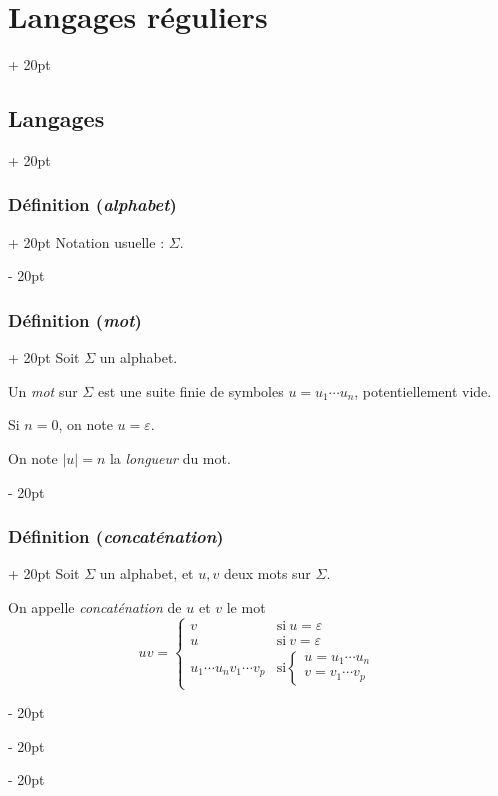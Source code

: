 \documentclass[a4paper, 12pt, twoside]{article}
\newcommand{\abs}[1]{\left\lvert #1 \right\rvert}
\newcommand{\ind}[1][20pt]{\advance\leftskip + #1}
\newcommand{\deind}[1][20pt]{\advance\leftskip - #1}
\newenvironment{indt}[2][20pt]{#2 \par \ind[#1]}{\par \deind} %
\begin{document}
\begin{indt}{\section{Langages réguliers}}
\begin{indt}{\subsection{Langages}}
\begin{indt}{\subsubsection{Définition (\textit{alphabet})}}
                Notation usuelle : $\Sigma$.
            \end{indt}

            \vspace{12pt}
            
            \begin{indt}{\subsubsection{Définition (\textit{mot})}}
                Soit $\Sigma$ un alphabet.

                Un \emph{mot} sur $\Sigma$ est une suite finie de symboles $u = u_1 \cdots u_n$, potentiellement vide.

                Si $n = 0$, on note $u = \varepsilon$.

                On note $\abs u = n$ la \emph{longueur} du mot.
            \end{indt}

            \vspace{12pt}
            
            \begin{indt}{\subsubsection{Définition (\textit{concaténation})}}
                Soit $\Sigma$ un alphabet, et $u, v$ deux mots sur $\Sigma$.

                On appelle \emph{concaténation} de $u$ et $v$ le mot
                \[
                    uv =
                    \begin{cases}
                        v & \text{si}\ u = \varepsilon
                        \\
                        u & \text{si}\ v = \varepsilon
                        \\
                        u_1 \cdots u_n v_1 \cdots v_p
                        & \text{si}
                        \begin{cases}
                            u = u_1 \cdots u_n
                            \\
                            v = v_1 \cdots v_p
                        \end{cases}
                    \end{cases}
                \]



\end{indt}
\end{indt}
\end{indt}
\end{document}
